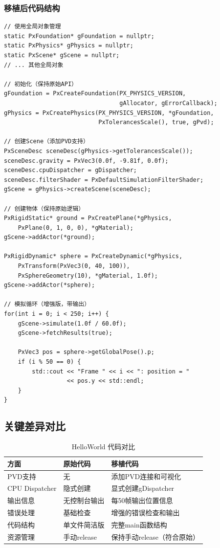 \subsubsection{移植后代码结构}
\begin{lstlisting}[caption={移植后example\_helloworld.cpp核心代码}]
// 使用全局对象管理
static PxFoundation* gFoundation = nullptr;
static PxPhysics* gPhysics = nullptr;
static PxScene* gScene = nullptr;
// ... 其他全局对象

// 初始化（保持原始API）
gFoundation = PxCreateFoundation(PX_PHYSICS_VERSION,
                                 gAllocator, gErrorCallback);
gPhysics = PxCreatePhysics(PX_PHYSICS_VERSION, *gFoundation,
                           PxTolerancesScale(), true, gPvd);

// 创建Scene（添加PVD支持）
PxSceneDesc sceneDesc(gPhysics->getTolerancesScale());
sceneDesc.gravity = PxVec3(0.0f, -9.81f, 0.0f);
sceneDesc.cpuDispatcher = gDispatcher;
sceneDesc.filterShader = PxDefaultSimulationFilterShader;
gScene = gPhysics->createScene(sceneDesc);

// 创建物体（保持原始逻辑）
PxRigidStatic* ground = PxCreatePlane(*gPhysics,
    PxPlane(0, 1, 0, 0), *gMaterial);
gScene->addActor(*ground);

PxRigidDynamic* sphere = PxCreateDynamic(*gPhysics,
    PxTransform(PxVec3(0, 40, 100)),
    PxSphereGeometry(10), *gMaterial, 1.0f);
gScene->addActor(*sphere);

// 模拟循环（增强版，带输出）
for(int i = 0; i < 250; i++) {
    gScene->simulate(1.0f / 60.0f);
    gScene->fetchResults(true);

    PxVec3 pos = sphere->getGlobalPose().p;
    if (i % 50 == 0) {
        std::cout << "Frame " << i << ": position = "
                  << pos.y << std::endl;
    }
}
\end{lstlisting}

\subsection{关键差异对比}
\begin{table}[h]
\centering
\caption{HelloWorld 代码对比}
\begin{tabular}{|l|p{5cm}|p{5cm}|}
\hline
\textbf{方面} & \textbf{原始代码} & \textbf{移植代码} \\ \hline
PVD支持 & 无 & 添加PVD连接和可视化 \\ \hline
CPU Dispatcher & 隐式创建 & 显式创建gDispatcher \\ \hline
输出信息 & 无控制台输出 & 每50帧输出位置信息 \\ \hline
错误处理 & 基础检查 & 增强的错误检查和输出 \\ \hline
代码结构 & 单文件简洁版 & 完整main函数结构 \\ \hline
资源管理 & 手动release & 保持手动release（符合原始） \\ \hline
\end{tabular}
\end{table}

